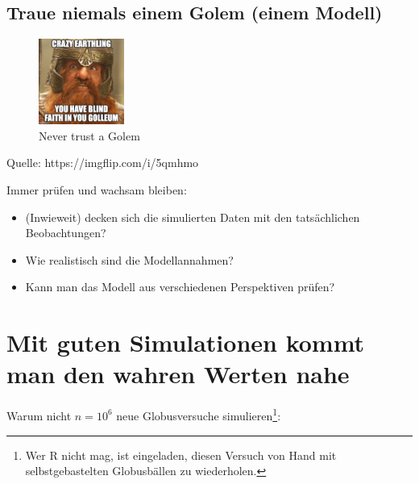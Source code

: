 \documentclass[
  a4paper,
  DIV=11]{scrreprt}
\providecommand{\tightlist}{%
  \setlength{\itemsep}{0pt}\setlength{\parskip}{0pt}}\usepackage{longtable,booktabs,array}
\theoremstyle{definition}
\theoremstyle{remark}
\begin{document}
\hypertarget{traue-niemals-einem-golem-einem-modell}{%
\subsection{Traue niemals einem Golem (einem
Modell)}\label{traue-niemals-einem-golem-einem-modell}}

\begin{figure}

{\centering \includegraphics[width=0.25\textwidth,height=\textheight]{./img/5qmhmo.jpg}

}

\caption{Never trust a Golem}

\end{figure}

Quelle: https://imgflip.com/i/5qmhmo

Immer prüfen und wachsam bleiben:

\begin{itemize}
\tightlist
\item
  (Inwieweit) decken sich die simulierten Daten mit den tatsächlichen
  Beobachtungen?
\item
  Wie realistisch sind die Modellannahmen?
\item
  Kann man das Modell aus verschiedenen Perspektiven prüfen?
\end{itemize}

\hypertarget{mit-guten-simulationen-kommt-man-den-wahren-werten-nahe}{%
\section{Mit guten Simulationen kommt man den wahren Werten
nahe}\label{mit-guten-simulationen-kommt-man-den-wahren-werten-nahe}}

Warum nicht \(n=10^6\) neue Globusversuche simulieren\footnote{Wer R
  nicht mag, ist eingeladen, diesen Versuch von Hand mit
  selbstgebastelten Globusbällen zu wiederholen.}:
\end{document}
